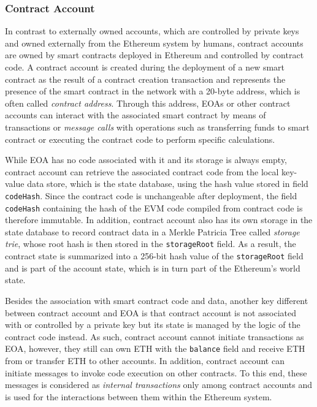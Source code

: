 \subsubsection{Contract Account}

In contrast to externally owned accounts, which are controlled by private keys and owned externally from the Ethereum system by humans, contract accounts are owned by smart contracts deployed in Ethereum and controlled by contract code. A contract account is created during the deployment of a new smart contract as the result of a contract creation transaction and represents the presence of the smart contract in the network with a 20-byte address, which is often called \textit{contract address}. Through this address, EOAs or other contract accounts can interact with the associated smart contract by means of transactions or \textit{message calls} with operations such as transferring funds to smart contract or executing the contract code to perform specific calculations. 

While EOA has no code associated with it and its storage is always empty, contract account can retrieve the associated contract code from the local key-value data store, which is the state database, using the hash value stored in field \texttt{codeHash}. Since the contract code is unchangeable after deployment, the field \texttt{codeHash} containing the hash of the EVM code compiled from contract code is therefore immutable. In addition, contract account also has its own storage in the state database to record contract data in a Merkle Patricia Tree called \textit{storage trie}, whose root hash is then stored in the \texttt{storageRoot} field. As a result, the contract state is summarized into a 256-bit hash value of the \texttt{storageRoot} field and is part of the account state, which is in turn part of the Ethereum's world state. 

Besides the association with smart contract code and data, another key different between contract account and EOA is that contract account is not associated with or controlled by a private key but its state is managed by the logic of the contract code instead. As such, contract account cannot initiate transactions as EOA, however, they still can own ETH with the \texttt{balance} field and receive ETH from or transfer ETH to other accounts. In addition, contract account can initiate messages to invoke code execution on other contracts. To this end, these messages is considered as \textit{internal transactions} only among contract accounts and is used for the interactions between them within the Ethereum system.

